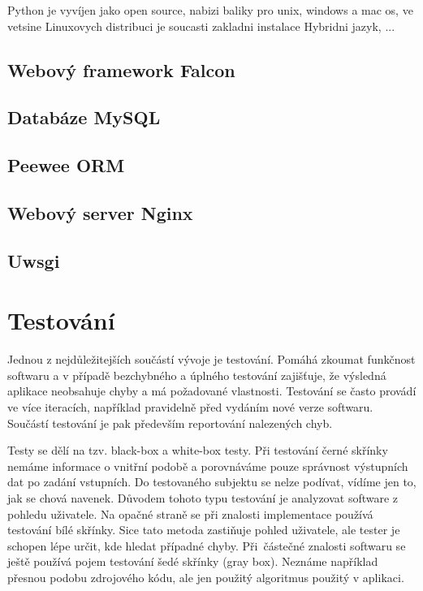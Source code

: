 \documentclass[thesis=B,czech]{FITthesis}[2012/06/26]
\begin{document}
Python je vyvíjen jako open source, nabizi baliky pro unix, windows a mac os, ve vetsine Linuxovych distribuci je soucasti zakladni instalace
Hybridni jazyk, ...

\section{Webový framework Falcon}

\section{Databáze MySQL}

\section{Peewee ORM}

\section{Webový server Nginx}

\section{Uwsgi}



\chapter{Testování}

\indent

Jednou z nejdůležitejších součástí vývoje je testování. Pomáhá zkoumat funkčnost softwaru a v případě bezchybného
a úplného testování zajišťuje, že výsledná aplikace neobsahuje chyby a má požadované vlastnosti.
Testování se často provádí ve více iteracích, například pravidelně před vydáním nové verze softwaru.
Součástí testování je pak především reportování nalezených chyb.

\medskip

Testy se dělí na tzv. black-box a white-box testy. Při testování černé skřínky nemáme informace o vnitřní podobě a porovnáváme
pouze správnost výstupních dat po zadání vstupních. Do testovaného subjektu se nelze podívat, vídíme jen to, jak se chová navenek.
Důvodem tohoto typu testování je analyzovat software z pohledu uživatele.
Na opačné straně se při znalosti implementace používá testování bílé skřínky. Sice tato metoda zastiňuje pohled uživatele,
ale tester je schopen lépe určit, kde hledat případné chyby. Při~částečné znalosti softwaru se ještě používá pojem testování šedé skřínky (gray box).
Neznáme například přesnou podobu zdrojového kódu, ale jen použitý algoritmus použitý v aplikaci. 
\end{document}
